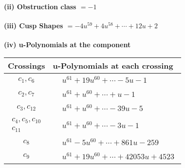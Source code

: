 \documentclass[1p]{elsarticle_modified}
\theoremstyle{definition}
\begin{document}
\flushleft \textbf{(ii) Obstruction class $= -1$}\\~\\
\flushleft \textbf{(iii) Cusp Shapes $= -4 u^{59}+4 u^{58}+\cdots+12 u+2$}\\~\\
\newpage\renewcommand{\arraystretch}{1}
\flushleft \textbf{(iv) u-Polynomials at the component}\newline \\
\begin{tabular}{m{50pt}|m{274pt}}
Crossings & \hspace{64pt}u-Polynomials at each crossing \\
\hline $$\begin{aligned}c_{1},c_{6}\end{aligned}$$&$\begin{aligned}
&u^{61}+19 u^{60}+\cdots-5 u-1
\end{aligned}$\\
\hline $$\begin{aligned}c_{2},c_{7}\end{aligned}$$&$\begin{aligned}
&u^{61}+u^{60}+\cdots+u-1
\end{aligned}$\\
\hline $$\begin{aligned}c_{3},c_{12}\end{aligned}$$&$\begin{aligned}
&u^{61}+u^{60}+\cdots-39 u-5
\end{aligned}$\\
\hline $$\begin{aligned}c_{4},c_{5},c_{10}\\c_{11}\end{aligned}$$&$\begin{aligned}
&u^{61}+u^{60}+\cdots-3 u-1
\end{aligned}$\\
\hline $$\begin{aligned}c_{8}\end{aligned}$$&$\begin{aligned}
&u^{61}-5 u^{60}+\cdots+861 u-259
\end{aligned}$\\
\hline $$\begin{aligned}c_{9}\end{aligned}$$&$\begin{aligned}
&u^{61}+19 u^{60}+\cdots+42053 u+4523
\end{aligned}$\\
\hline
\end{tabular}\\~\\
\end{document}
